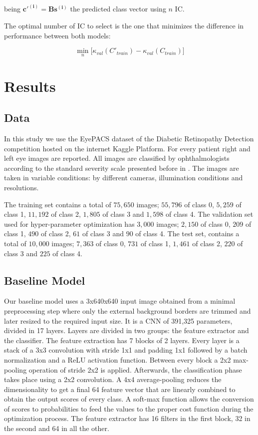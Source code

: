 \documentclass[preprint]{elsarticle}
\theoremstyle{definition} %
\theoremstyle{remark}
\begin{document}
being $\boldsymbol{c'^{(i)}} = \boldsymbol{B} \boldsymbol{s^{(i)}}$ the predicted class vector using $n$ IC.

The optimal number of IC to select is the one that minimizes the difference in performance between both models:

\begin{equation}
\min_{n} \big[ \kappa_{val} (C'_{train}) - \kappa_{val} (C_{train}) \big] 
\end{equation}

\section{Results}\label{sec:results}

\subsection{Data}

In this study we use the EyePACS dataset of the Diabetic Retinopathy Detection competition hosted on the internet Kaggle Platform.  For every patient right and left eye images are reported. All images are classified by ophthalmologists according to the standard severity scale presented before in \citep{diaclass}. The images are taken in variable conditions: by different cameras, illumination conditions and resolutions. 

The training set contains a total of $75,650$ images; $55,796$ of class 0, $5,259$ of class 1, $11,192$ of class 2, $1,805$ of class 3 and $1,598$ of class 4. The validation set used for hyper-parameter optimization has $3,000$ images; $2,150$ of class 0, $209$ of class 1, $490$ of class 2, $61$ of class 3 and $90$ of class 4. The test set, contains a total of $10,000$ images; $7,363$ of class 0, $731$ of class 1, $1,461$ of class 2, $220$ of class 3 and $225$ of class 4. 

\subsection{Baseline Model}

Our baseline model uses a 3x640x640 input image obtained from a minimal preprocessing step where only the external background borders are trimmed and later resized to the required input size. It is a CNN of 391,325 parameters, divided in 17 layers. Layers are divided in two groups: the feature extractor and the classifier. The feature extraction has 7 blocks of 2 layers. Every layer is a stack of a 3x3 convolution with stride 1x1 and padding 1x1 followed by a batch normalization and a ReLU activation function. Between every block a 2x2 max-pooling operation of stride 2x2 is applied.  Afterwards, the classification phase takes place using a 2x2 convolution. A 4x4 average-pooling reduces the dimensionality to get a final 64 feature vector that are linearly combined to obtain the output scores of every class. A soft-max function allows the conversion of scores to probabilities to feed the values to the proper cost function during the optimization process. The feature extractor has 16 filters in the first block, 32 in the second and 64 in all the other.
\end{document}
